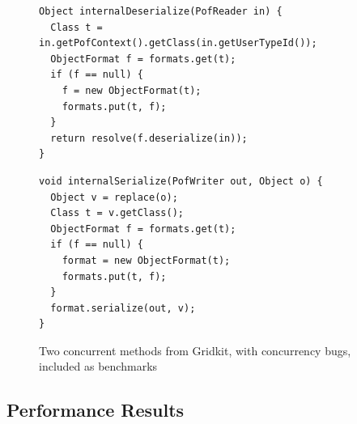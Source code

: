 \begin{figure}
%
\begin{lstlisting}
Object internalDeserialize(PofReader in) {
  Class t = in.getPofContext().getClass(in.getUserTypeId());
  ObjectFormat f = formats.get(t);
  if (f == null) {
    f = new ObjectFormat(t);
    formats.put(t, f);
  }
  return resolve(f.deserialize(in));
}
\end{lstlisting}

\begin{lstlisting}
void internalSerialize(PofWriter out, Object o) {
  Object v = replace(o);
  Class t = v.getClass();
  ObjectFormat f = formats.get(t);
  if (f == null) {
    format = new ObjectFormat(t);
    formats.put(t, f);
  }
  format.serialize(out, v);
}
\end{lstlisting}

	\caption{\label{Fi:gridkitPair}Two concurrent methods from Gridkit, with concurrency bugs, included as benchmarks}
\end{figure}

\subsection{Performance Results} 

